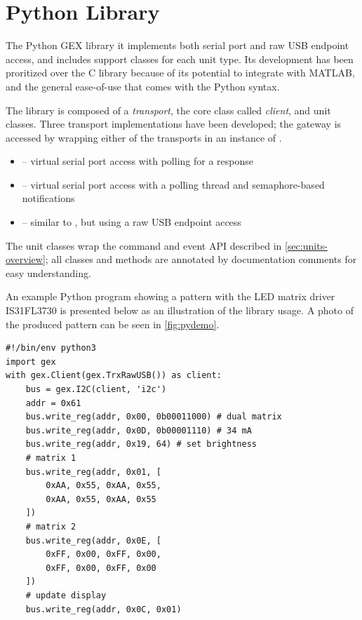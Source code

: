 \section{Python Library}

The Python GEX library it implements both serial port and raw USB endpoint access, and includes support classes for each unit type. Its development has been proritized over the C library because of its potential to integrate with MATLAB, and the general ease-of-use that comes with the Python syntax.

The library is composed of a \textit{transport}, the core class called \textit{client}, and unit classes. Three transport implementations have been developed; the gateway is accessed by wrapping either of the transports in an instance of .

\begin{itemize}
	\item {} -- virtual serial port access with polling for a response

	\item {} -- virtual serial port access with a polling thread and semaphore-based notifications

	\item {} -- similar to , but using a raw USB endpoint access
\end{itemize}

The unit classes wrap the command and event \gls{API} described in \cref{sec:units-overview}; all classes and methods are annotated by documentation comments for easy understanding.

An example Python program showing a pattern with the \gls{LED} matrix driver IS31FL3730 is presented below as an illustration of the library usage. A photo of the produced pattern can be seen in \cref{fig:pydemo}.

\begin{verbatim}
#!/bin/env python3
import gex
with gex.Client(gex.TrxRawUSB()) as client:
    bus = gex.I2C(client, 'i2c')
    addr = 0x61
    bus.write_reg(addr, 0x00, 0b00011000) # dual matrix
    bus.write_reg(addr, 0x0D, 0b00001110) # 34 mA
    bus.write_reg(addr, 0x19, 64) # set brightness
    # matrix 1
    bus.write_reg(addr, 0x01, [
        0xAA, 0x55, 0xAA, 0x55,
        0xAA, 0x55, 0xAA, 0x55
    ])
    # matrix 2
    bus.write_reg(addr, 0x0E, [
        0xFF, 0x00, 0xFF, 0x00,
        0xFF, 0x00, 0xFF, 0x00
    ])
    # update display
    bus.write_reg(addr, 0x0C, 0x01)
\end{verbatim}

